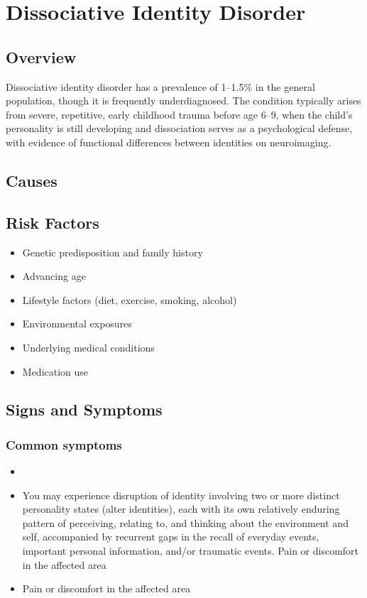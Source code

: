 \chapter{Dissociative Identity Disorder}
\label{sec:Dissociative Identity Disorder}

\section{Overview}
Dissociative identity disorder has a prevalence of 1--1.5\% in the general population, though it is frequently underdiagnosed. The condition typically arises from severe, repetitive, early childhood trauma before age 6--9, when the child's personality is still developing and dissociation serves as a psychological defense, with evidence of functional differences between identities on neuroimaging.
\section{Causes}
\section{Risk Factors}

\begin{itemize}[noitemsep]
  \item Genetic predisposition and family history
  \item Advancing age
  \item Lifestyle factors (diet, exercise, smoking, alcohol)
  \item Environmental exposures
  \item Underlying medical conditions
  \item Medication use
\end{itemize}
\section{Signs and Symptoms}

\subsection{Common symptoms}
\begin{itemize}[noitemsep]
  \item \item You may experience disruption of identity involving two or more distinct personality states (alter identities), each with its own relatively enduring pattern of perceiving, relating to, and thinking about the environment and self, accompanied by recurrent gaps in the recall of everyday events, important personal information, and/or traumatic events. Pain or discomfort in the affected area    \item Pain or discomfort in the affected area
  \end{itemize}

